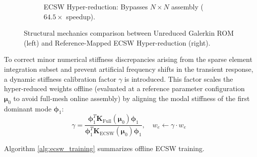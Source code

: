 \begin{figure}[htbp]
\begin{subfigure}{0.48\textwidth}
        \caption{ECSW Hyper-reduction: Bypasses $N \times N$ assembly ($64.5\times$ speedup).}
    \end{subfigure}
    \caption{Structural mechanics comparison between Unreduced Galerkin ROM (left) and Reference-Mapped ECSW Hyper-reduction (right).}
    \label{fig:galerkin_vs_ecsw_schematic}
\end{figure}

To correct minor numerical stiffness discrepancies arising from the sparse element integration subset and prevent artificial frequency shifts in the transient response, a dynamic stiffness calibration factor $\gamma$ is introduced. This factor scales the hyper-reduced weights offline (evaluated at a reference parameter configuration $\boldsymbol{\mu}_0$ to avoid full-mesh online assembly) by aligning the modal stiffness of the first dominant mode $\boldsymbol{\phi}_1$:
\begin{equation}
    \gamma = \frac{\boldsymbol{\phi}_1^T \mathbf{K}_{\text{Full}}(\boldsymbol{\mu}_0) \boldsymbol{\phi}_1}{\boldsymbol{\phi}_1^T \mathbf{K}_{\text{ECSW}}(\boldsymbol{\mu}_0) \boldsymbol{\phi}_1}, \quad w_e \gets \gamma \cdot w_e
\end{equation}

Algorithm \ref{alg:ecsw_training} summarizes offline ECSW training.


